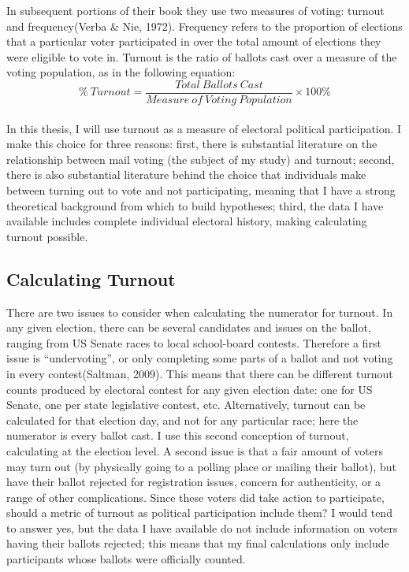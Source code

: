 \documentclass[12pt,twoside]{reedthesis}
\begin{document}
  In subsequent portions of their book they use two measures of voting:
  turnout and frequency(Verba \& Nie, 1972). Frequency refers to the
  proportion of elections that a particular voter participated in over the
  total amount of elections they were eligible to vote in. Turnout is the
  ratio of ballots cast over a measure of the voting population, as in the
  following equation:\\
  \[ \% ~Turnout = \frac{Total~Ballots~Cast}{Measure~of~Voting~Population}\times100\%\]\\
  In this thesis, I will use turnout as a measure of electoral political
  participation. I make this choice for three reasons: first, there is
  substantial literature on the relationship between mail voting (the
  subject of my study) and turnout; second, there is also substantial
  literature behind the choice that individuals make between turning out
  to vote and not participating, meaning that I have a strong theoretical
  background from which to build hypotheses; third, the data I have
  available includes complete individual electoral history, making
  calculating turnout possible.
  
  \subsection{Calculating Turnout}\label{calculating-turnout}
  
  There are two issues to consider when calculating the numerator for
  turnout. In any given election, there can be several candidates and
  issues on the ballot, ranging from US Senate races to local school-board
  contests. Therefore a first issue is ``undervoting'', or only completing
  some parts of a ballot and not voting in every contest(Saltman, 2009).
  This means that there can be different turnout counts produced by
  electoral contest for any given election date: one for US Senate, one
  per state legislative contest, etc. Alternatively, turnout can be
  calculated for that election day, and not for any particular race; here
  the numerator is every ballot cast. I use this second conception of
  turnout, calculating at the election level. A second issue is that a
  fair amount of voters may turn out (by physically going to a polling
  place or mailing their ballot), but have their ballot rejected for
  registration issues, concern for authenticity, or a range of other
  complications. Since these voters did take action to participate, should
  a metric of turnout as political participation include them? I would
  tend to answer yes, but the data I have available do not include
  information on voters having their ballots rejected; this means that my
  final calculations only include participants whose ballots were
  officially counted.
  
\end{document}
